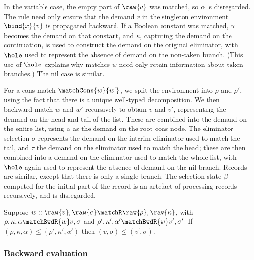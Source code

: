 

In the variable case, the empty part of $\raw{v}$ was matched, so $\alpha$ is disregarded. The rule need only ensure that the demand $v$ in the singleton environment $\bind{x}{v}$ is propagated backward. If a Boolean constant was matched, $\alpha$ becomes the demand on that constant, and $\kappa$, capturing the demand on the continuation, is used to construct the demand on the original eliminator, with $\hole$ used to represent the absence of demand on the non-taken branch. (This use of $\hole$ explains why matches $w$ need only retain information about taken branches.) The nil case is similar.

For a cons match $\matchCons{w}{w'}$, we split the environment into $\rho$ and $\rho'$, using the fact that there is a unique well-typed decomposition. We then backward-match $w$ and $w'$ recursively to obtain $v$ and $v'$, representing the demand on the head and tail of the list. These are combined into the demand on the entire list, using $\alpha$ as the demand on the root cons node. The eliminator selection $\sigma$ represents the demand on the interim eliminator used to match the tail, and $\tau$ the demand on the eliminator used to match the head; these are then combined into a demand on the eliminator used to match the whole list, with $\hole$ again used to represent the absence of demand on the nil branch. Records are similar, except that there is only a single branch. The selection state $\beta$ computed for the initial part of the record is an artefact of processing records recursively, and is disregarded.

\begin{lemma}
   Suppose $w :: \raw{v}, \raw{\sigma} \matchR \raw{\rho}, \raw{\kappa}$, with $\rho, \kappa, \alpha \matchBwdR{w} v, \sigma$ and $\rho', \kappa', \alpha' \matchBwdR{w} v', \sigma'$. If $(\rho, \kappa, \alpha) \leq (\rho', \kappa', \alpha')$ then $(v, \sigma) \leq (v', \sigma)$.
\end{lemma}

\subsubsection{Backward evaluation}
\label{sec:data-dependencies:analyses:bwd:eval}


